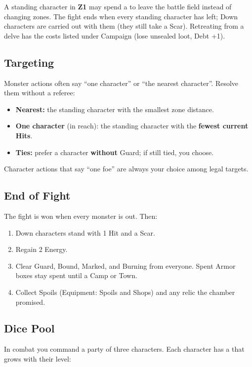 A standing character in \textbf{Z1} may spend a  to leave the battle field instead of changing zones. The fight ends when every standing character has left; Down characters are carried out with them (they still take a Scar). Retreating from a delve has the costs listed under Campaign (lose unsealed loot, Debt +1).

\subsection{Targeting}

Monster actions often say ``one character'' or ``the nearest character''. Resolve them without a referee:

\begin{itemize}
    \item \textbf{Nearest:} the standing character with the smallest zone distance.
    \item \textbf{One character} (in reach): the standing character with the \textbf{fewest current Hits}.
    \item \textbf{Ties:} prefer a character \textbf{without} Guard; if still tied, you choose.
\end{itemize}

Character actions that say ``one foe'' are always your choice among legal targets.

\subsection{End of Fight}

The fight is won when every monster is out. Then:
\begin{enumerate}
    \item Down characters stand with 1 Hit and a Scar.
    \item Regain 2 Energy.
    \item Clear Guard, Bound, Marked, and Burning from everyone. Spent Armor boxes stay spent until a Camp or Town.
    \item Collect Spoils (Equipment: Spoils and Shops) and any relic the chamber promised.
\end{enumerate}

\subsection{Dice Pool}

In combat you command a party of three characters. Each character has a  that grows with their level:

